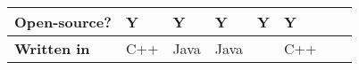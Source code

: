 \documentclass{article}
\begin{document}
\begin{table}[h]
\begin{tabular}{@{}l| L{3cm}| L{3cm}| L{3cm}| L{3cm}| L{3cm}| L{3cm}| L{3cm}|@{}}
\textbf{Open-source?}               & Y                                                                                                                                                               & Y                                                                                                                        & Y                                                                                  & Y                                                                                   & Y                                   \\ \midrule
\textbf{Written in}                 & C++                                                                                                                                                             & Java                                                                                                                     & Java                                                                               &                                                                                     & C++                                 \\ \bottomrule
\end{tabular}
\end{table}

\end{document}
